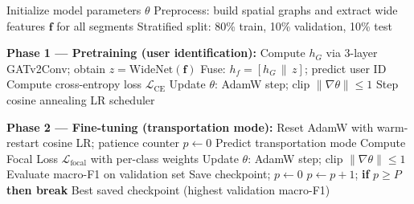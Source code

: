 \documentclass[conference]{IEEEtran}
\begin{document}
\begin{algorithm}[t]
\caption{Two-Phase Training Procedure}
\label{alg:training}
\begin{algorithmic}[1]

\STATE Initialize model parameters $\theta$
\STATE Preprocess: build spatial graphs and extract wide features $\mathbf{f}$ for all segments
\STATE Stratified split: 80\% train, 10\% validation, 10\% test

\STATE \textbf{Phase 1 --- Pretraining (user identification):}
        \STATE Compute $h_G$ via 3-layer GATv2Conv; obtain $z = \text{WideNet}(\mathbf{f})$
        \STATE Fuse: $h_f = [h_G \, \| \, z]$; predict user ID
        \STATE Compute cross-entropy loss $\mathcal{L}_{\text{CE}}$
        \STATE Update $\theta$: AdamW step; clip $\|\nabla\theta\| \leq 1$
    \ENDFOR
    \STATE Step cosine annealing LR scheduler
\ENDFOR

\STATE \textbf{Phase 2 --- Fine-tuning (transportation mode):}
\STATE Reset AdamW with warm-restart cosine LR; patience counter $p \leftarrow 0$
        \STATE Predict transportation mode
        \STATE Compute Focal Loss $\mathcal{L}_{\text{focal}}$ with per-class weights
        \STATE Update $\theta$: AdamW step; clip $\|\nabla\theta\| \leq 1$
    \ENDFOR
    \STATE Evaluate macro-F1 on validation set
        \STATE Save checkpoint; $p \leftarrow 0$
    \ELSE
        \STATE $p \leftarrow p + 1$; \textbf{if} $p \geq P$ \textbf{then break}
    \ENDIF
\ENDFOR
\RETURN Best saved checkpoint (highest validation macro-F1)

\end{algorithmic}
\end{algorithm}



\end{document}
